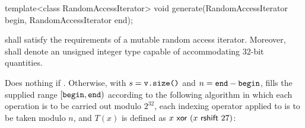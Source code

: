 %
\begin{itemdecl}
template<class RandomAccessIterator>
  void generate(RandomAccessIterator begin, RandomAccessIterator end);
\end{itemdecl}

\begin{itemdescr}
\pnum\requires {}
  shall satisfy the requirements of a mutable random access iterator.
  Moreover,
  shall denote an unsigned integer type
  capable of accommodating 32-bit quantities.

\pnum\effects
 Does nothing if .
 Otherwise,
 with $s = \texttt{v.size()}$
 and  $n = \texttt{end} - \texttt{begin}$,
 fills the supplied range $[\texttt{begin},\texttt{end})$
 according to the following algorithm
 in which
 each operation is to be carried out modulo $2^{32}$,
 each indexing operator applied to  is to be taken modulo $n$,
 and $T(x)$ is defined as $x \, \, \mathsf{xor} \, \, (x \, \, \mathsf{rshift} \, \, 27)$:


\end{itemdescr}
